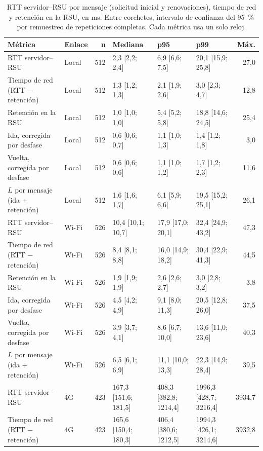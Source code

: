 \begin{table}[H]
\centering
\caption{RTT servidor--RSU por mensaje (solicitud inicial y renovaciones), tiempo de red y retención en la RSU, en ms. Entre corchetes, intervalo de confianza del 95~\% por remuestreo de repeticiones completas. Cada métrica usa un solo reloj.}
\label{tab:rtt_mensaje}
\small
\begin{tabular}{llrlllr}
\toprule
\textbf{Métrica} & \textbf{Enlace} & \textbf{n} & \textbf{Mediana} & \textbf{p95} & \textbf{p99} & \textbf{Máx.} \\
\midrule
RTT servidor--RSU & Local & 512 & 2,3 [2,2; 2,4] & 6,9 [6,6; 7,5] & 20,1 [15,9; 25,8] & 27,0 \\
Tiempo de red (RTT $-$ retención) & Local & 512 & 1,3 [1,2; 1,3] & 2,1 [1,9; 2,6] & 3,0 [2,3; 4,7] & 12,8 \\
Retención en la RSU & Local & 512 & 1,0 [1,0; 1,0] & 5,4 [5,2; 5,8] & 18,8 [14,6; 24,5] & 25,4 \\
Ida, corregida por desfase & Local & 512 & 0,6 [0,6; 0,7] & 1,1 [1,0; 1,3] & 1,4 [1,2; 1,8] & 3,0 \\
Vuelta, corregida por desfase & Local & 512 & 0,6 [0,6; 0,6] & 1,1 [1,0; 1,2] & 1,7 [1,2; 2,3] & 11,6 \\
$L$ por mensaje (ida + retención) & Local & 512 & 1,6 [1,6; 1,7] & 6,1 [5,9; 6,6] & 19,5 [15,2; 25,1] & 26,1 \\
\addlinespace
RTT servidor--RSU & Wi-Fi & 526 & 10,4 [10,1; 10,7] & 17,9 [17,0; 20,1] & 32,4 [24,9; 43,2] & 47,3 \\
Tiempo de red (RTT $-$ retención) & Wi-Fi & 526 & 8,4 [8,1; 8,8] & 16,0 [14,9; 18,2] & 30,4 [22,9; 41,3] & 44,5 \\
Retención en la RSU & Wi-Fi & 526 & 1,9 [1,9; 1,9] & 2,6 [2,6; 2,7] & 3,0 [2,8; 3,2] & 3,8 \\
Ida, corregida por desfase & Wi-Fi & 526 & 4,5 [4,2; 4,9] & 9,1 [8,0; 11,3] & 20,5 [12,8; 26,0] & 37,5 \\
Vuelta, corregida por desfase & Wi-Fi & 526 & 3,9 [3,7; 4,1] & 8,6 [6,7; 10,0] & 13,6 [11,0; 23,6] & 40,3 \\
$L$ por mensaje (ida + retención) & Wi-Fi & 526 & 6,5 [6,1; 6,9] & 11,1 [10,0; 13,3] & 22,3 [14,9; 28,4] & 39,5 \\
\addlinespace
RTT servidor--RSU & 4G & 423 & 167,3 [151,6; 181,5] & 408,3 [382,8; 1214,4] & 1996,3 [428,7; 3216,4] & 3934,7 \\
Tiempo de red (RTT $-$ retención) & 4G & 423 & 165,6 [150,4; 180,3] & 406,4 [380,6; 1212,5] & 1994,3 [426,1; 3214,6] & 3932,8 \\

\end{tabular}
\end{table}

